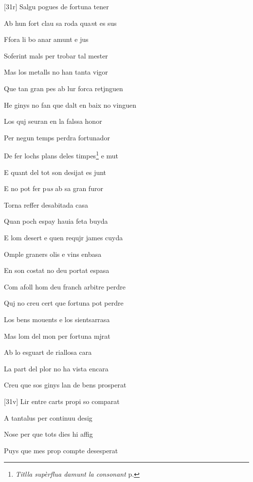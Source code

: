 \documentclass[12pt]{article}
\begin{document}
\begin{estrofa}

 [31r] Salgu pogues de fortuna tener

 Ab hun fort clau sa roda qua\textit{n}t es sus

 Ffora li bo anar amunt e jus

 Soferint mals per trobar tal mester

 Mas los metalls no han tanta vigor

 Que tan gran pes ab lur forca retjnguen

 He ginys no fan que dalt en baix no vinguen

 Los quj seuran en la falssa honor

\end{estrofa}



\begin{estrofa}

 Per negun temps perdra fortunador

 De fer lochs plans deles timpes\footnote{\textit{Titlla sup\`{e}rflua damunt la
consonant} p.} e mut

 E quant del tot son desijat es junt

 E no pot fer p\textit{us }ab sa gran furor

 Torna reffer desabitada casa

 Quan poch espay hauia feta buyda

 E lom desert e quen requjr james cuyda

 Omple graners olis e vins enbasa

\end{estrofa}



\begin{estrofa}

 En son costat no deu portat espasa

 Com afoll hom deu franch arbitre perdre

 Quj no creu cert que fortuna pot perdre

 Los bens mouents e los sientsarrasa

 Mas lom del mon per fortuna mjrat

 Ab lo esguart de riallosa cara

 La part del plor no ha vista encara

 Creu que sos ginys lan de bens prosperat

\end{estrofa}



\begin{estrofa}

 [31v] Lir entre carts propi so comparat

 A tantalus per continuu desig

 Nose per que tots dies hi affig

 Puys que mes prop compte desesperat

\end{estrofa}
\end{document}
